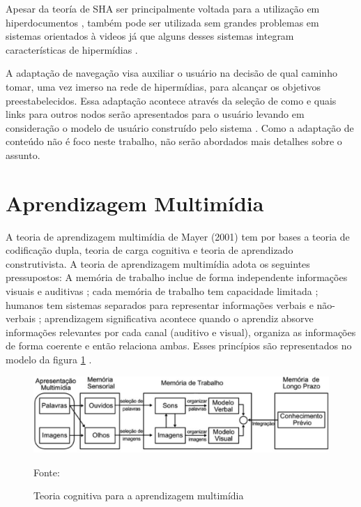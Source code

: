Apesar da teoría de SHA ser principalmente voltada para a utilização em hiperdocumentos \cite{brusilovsky1998}, também pode ser utilizada sem grandes problemas em sistemas orientados à videos já que alguns desses sistemas integram características de hipermídias \cite{aubert2005}.

A adaptação de navegação visa auxiliar o usuário na decisão de qual caminho tomar, uma vez imerso na rede de hipermídias, para alcançar os objetivos preestabelecidos. Essa adaptação acontece através da seleção de como e quais links para outros nodos serão apresentados para o usuário levando em consideração o modelo de usuário construído pelo sistema \cite{brusilovsky1996}. Como a adaptação de conteúdo não é foco neste trabalho, não serão abordados mais detalhes sobre o assunto.

\section{Aprendizagem Multimídia}

A teoria de aprendizagem multimídia de Mayer (2001) tem por bases a teoria de codificação dupla, teoria de carga cognitiva e teoria de aprendizado construtivista. A teoria de aprendizagem multimídia adota os seguintes pressupostos: A memória de trabalho inclue de forma independente informações visuais e auditivas \cite{baddeley1986}; cada memória de trabalho tem capacidade limitada \cite{chandler1992}; humanos tem sistemas separados para representar  informações verbais e não-verbais \cite{paivio1986}; aprendizagem significativa acontece quando o aprendiz absorve informações relevantes por cada canal (auditivo e visual), organiza as informações de forma coerente e então relaciona ambas. Esses princípios são representados no modelo da figura \ref{fig:aprendizado} \cite{moreno2000}.

\begin{figure}[h!]
	\centering
  	\includegraphics[width=.9\linewidth]{figuras/aprendizado.eps}
  	\caption{Teoria cognitiva para a aprendizagem multimídia}
  	\small{Fonte: \cite{mayer2001}}
  	\label{fig:aprendizado}
\end{figure}

